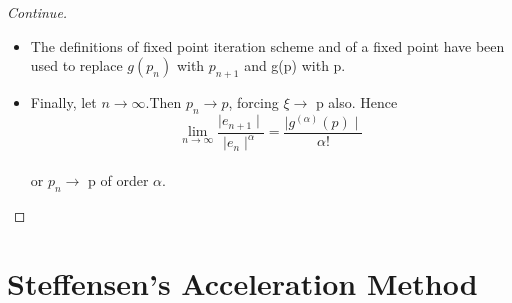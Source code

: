 \documentclass{beamer}
\begin{document}
\begin{frame}

\begin{proof}[Continue]
\begin{itemize}
\item[]<1->The definitions of fixed point iteration scheme and of a fixed point have been used to replace $g(p_n)$ with $p_{n+1}$ and g(p) with p.

 \item[]<2->Finally, let $n\rightarrow\infty$.Then $p_n\rightarrow p$, forcing $\xi\rightarrow$ p also.
Hence $$\lim_{n\to\infty}\frac{\mid e_{n+1}\mid}{\mid e_n\mid^\alpha}=\frac{\mid g^{(\alpha)}(p)\mid}{\alpha!}$$
\\or $p_n\rightarrow$ p of order $\alpha$.

\end{itemize}
\end{proof}


\end{frame}
\section{Steffensen's Acceleration Method}
\end{document}
